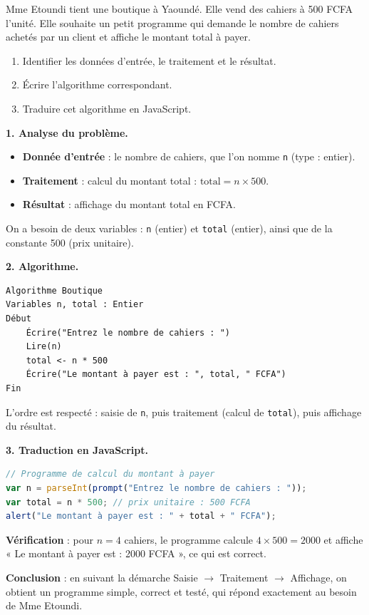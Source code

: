 \documentclass[11pt]{article}
\begin{document}
\begin{exoresolu}
Mme Etoundi tient une boutique à Yaoundé. Elle vend des cahiers à \num{500} FCFA l'unité. Elle souhaite un petit programme qui demande le nombre de cahiers achetés par un client et affiche le montant total à payer.
\begin{enumerate}
\item Identifier les données d'entrée, le traitement et le résultat.
\item Écrire l'algorithme correspondant.
\item Traduire cet algorithme en JavaScript.
\end{enumerate}
\tcblower
\textbf{1. Analyse du problème.}
\begin{itemize}
\item \textbf{Donnée d'entrée} : le nombre de cahiers, que l'on nomme \texttt{n} (type : entier).
\item \textbf{Traitement} : calcul du montant total : $\text{total} = n \times 500$.
\item \textbf{Résultat} : affichage du montant total en FCFA.
\end{itemize}
On a besoin de deux variables : \texttt{n} (entier) et \texttt{total} (entier), ainsi que de la constante \num{500} (prix unitaire).

\textbf{2. Algorithme.}
\begin{lstlisting}
Algorithme Boutique
Variables n, total : Entier
Début
    Écrire("Entrez le nombre de cahiers : ")
    Lire(n)
    total <- n * 500
    Écrire("Le montant à payer est : ", total, " FCFA")
Fin
\end{lstlisting}
L'ordre est respecté : saisie de \texttt{n}, puis traitement (calcul de \texttt{total}), puis affichage du résultat.

\textbf{3. Traduction en JavaScript.}
\begin{lstlisting}[language=JavaScript]
// Programme de calcul du montant à payer
var n = parseInt(prompt("Entrez le nombre de cahiers : "));
var total = n * 500; // prix unitaire : 500 FCFA
alert("Le montant à payer est : " + total + " FCFA");
\end{lstlisting}
\textbf{Vérification} : pour $n = 4$ cahiers, le programme calcule $4 \times 500 = \num{2000}$ et affiche « Le montant à payer est : 2000 FCFA », ce qui est correct.

\textbf{Conclusion} : en suivant la démarche Saisie $\rightarrow$ Traitement $\rightarrow$ Affichage, on obtient un programme simple, correct et testé, qui répond exactement au besoin de Mme Etoundi.
\end{exoresolu}
\end{document}
